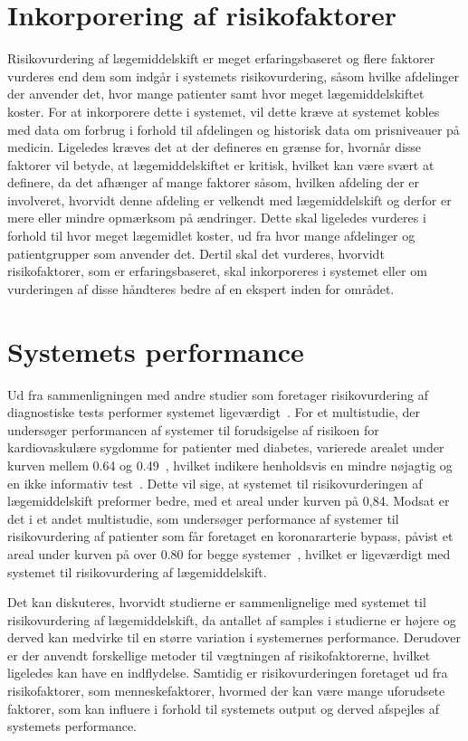 \section{Inkorporering af risikofaktorer}
Risikovurdering af lægemiddelskift er meget erfaringsbaseret og flere faktorer vurderes end dem som indgår i systemets risikovurdering, såsom hvilke afdelinger der anvender det, hvor mange patienter samt hvor meget lægemiddelskiftet koster. For at inkorporere dette i systemet, vil dette kræve at systemet kobles med data om forbrug i forhold til afdelingen og historisk data om prisniveauer på medicin. Ligeledes kræves det at der defineres en grænse for, hvornår disse faktorer vil betyde, at lægemiddelskiftet er kritisk, hvilket kan være svært at definere, da det afhænger af mange faktorer såsom, hvilken afdeling der er involveret, hvorvidt denne afdeling er velkendt med lægemiddelskift og derfor er mere eller mindre opmærksom på ændringer. Dette skal ligeledes vurderes i forhold til hvor meget lægemidlet koster, ud fra hvor mange afdelinger og patientgrupper som anvender det. Dertil skal det vurderes, hvorvidt risikofaktorer, som er erfaringsbaseret, skal inkorporeres i systemet eller om vurderingen af disse håndteres bedre af en ekspert inden for området.

\section{Systemets performance}
Ud fra sammenligningen med andre studier som foretager risikovurdering af diagnostiske tests performer systemet ligeværdigt~\citep{Chan2009,VanStraten2010}. For et multistudie, der undersøger performancen af systemer til forudsigelse af risikoen for kardiovaskulære sygdomme for patienter med diabetes, varierede arealet under kurven mellem 0.64 og 0.49~\citep{Chan2009}, hvilket indikere henholdsvis en mindre nøjagtig og en ikke informativ test~\citep{Greiner2000}. Dette vil sige, at systemet til risikovurderingen af lægemiddelskift preformer bedre, med et areal under kurven på 0,84. Modsat er det i et andet multistudie, som undersøger performance af systemer til risikovurdering af patienter som får foretaget en koronararterie bypass, påvist et areal under kurven på over 0.80 for begge systemer~\citep{VanStraten2010}, hvilket er ligeværdigt med systemet til risikovurdering af lægemiddelskift.

Det kan diskuteres, hvorvidt studierne er sammenlignelige med systemet til risikovurdering af lægemiddelskift, da antallet af samples i studierne er 
højere og derved kan medvirke til en større variation i systemernes performance. Derudover er der anvendt forskellige metoder til vægtningen af risikofaktorerne, hvilket ligeledes kan have en indflydelse. Samtidig er  risikovurderingen foretaget ud fra risikofaktorer, som menneskefaktorer, hvormed der kan være mange uforudsete faktorer, som kan influere i forhold til systemets output og derved afspejles af systemets performance. 

